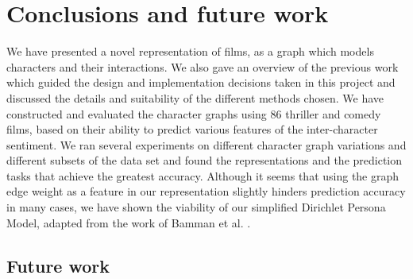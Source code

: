 \documentclass[bsc,frontabs,deptreport,singlespacing,parskip, twoside]{infthesis}
\begin{document}
\chapter{Conclusions and future work}

We have presented a novel representation of films, as a graph which models characters and their interactions. We also gave an overview of the previous work which guided the design and implementation decisions taken in this project and discussed the details and suitability of the different methods chosen. We have constructed and evaluated the character graphs using 86 thriller and comedy films, based on their ability to predict various features of the inter-character sentiment. We ran several experiments on different character graph variations and different subsets of the data set and found the representations and the prediction tasks that achieve the greatest accuracy. Although it seems that using the graph edge weight as a feature in our representation slightly hinders prediction accuracy in many cases, we have shown the viability of our simplified Dirichlet Persona Model, adapted from the work of Bamman et al. \cite{Bamman2013}.

\section{Future work}
\end{document}

